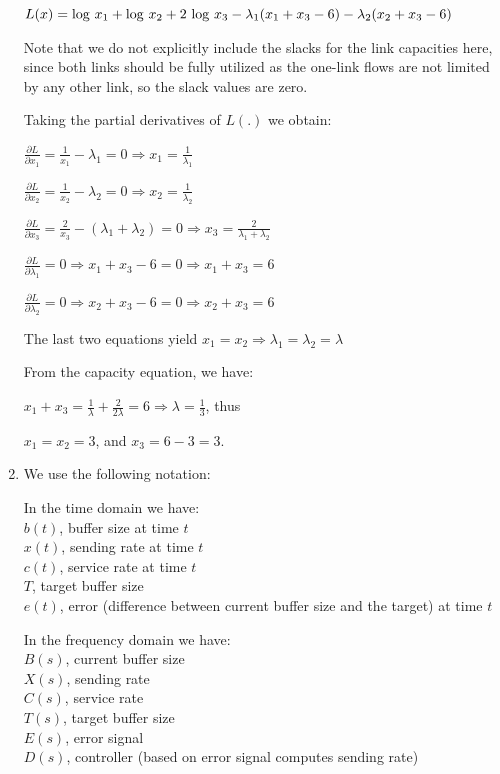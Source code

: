 \documentclass{article}
\def\pd#1#2{\frac{\partial#1}{\partial#2}}   %
\def\lg{{\rm log}}
\begin{document}
\begin{enumerate}
$L(x) = \lg\ x_1 + \lg\ x_2 + 2\ \lg\ x_3 - \lambda_1(x_1 + x_3 - 6) - \lambda_2(x_2 + x_3 - 6)$

Note that we do not explicitly include the slacks for the link capacities here, since both links should be fully utilized as the one-link flows are not limited by any other link, so the slack values are zero.

Taking the partial derivatives of $L(.)$ we obtain:

$\pd{L}{x_1} = \frac{1}{x_1} - \lambda_1 = 0 \Rightarrow x_1 = \frac{1}{\lambda_1} $

$\pd{L}{x_2} = \frac{1}{x_2} - \lambda_2 = 0 \Rightarrow x_2 = \frac{1}{\lambda_2} $

$\pd{L}{x_3} = \frac{2}{x_3} - (\lambda_1 + \lambda_2) = 0 \Rightarrow x_3 = \frac{2}{\lambda_1 + \lambda_2} $

$\pd{L}{\lambda_1} = 0  \Rightarrow x_1 + x_3 - 6 = 0 \Rightarrow x_1 + x_3 = 6 $

$\pd{L}{\lambda_2} = 0  \Rightarrow x_2 + x_3 - 6 = 0 \Rightarrow x_2 + x_3 = 6 $

The last two equations yield $x_1 = x_2  \Rightarrow \lambda_1 =  \lambda_2 = \lambda$

From the capacity equation, we have:

$x_1 + x_3 = \frac{1}{\lambda} + \frac{2}{2\lambda} = 6 \Rightarrow \lambda = \frac{1}{3}$, thus

$x_1 = x_2 = 3$, and $x_3 = 6 - 3 = 3. $


\item \noindent We use the following notation: \smallbreak

\noindent In the time domain we have:\\
\noindent $b(t)$, buffer size at time $t$\\
\noindent $x(t)$, sending rate at time $t$\\
\noindent $c(t)$, service rate at time $t$\\
\noindent $T$, target buffer size\\
\noindent $e(t)$, error (difference between current buffer size
and the target) at time $t$ \bigbreak

\noindent In the frequency domain we have:\\
\noindent $B(s)$, current buffer size\\
\noindent $X(s)$, sending rate\\
\noindent $C(s)$, service rate\\
\noindent $T(s)$, target buffer size\\
\noindent $E(s)$, error signal\\
\noindent $D(s)$, controller (based on error signal computes
sending rate) \bigbreak


\end{enumerate}
\end{document}
